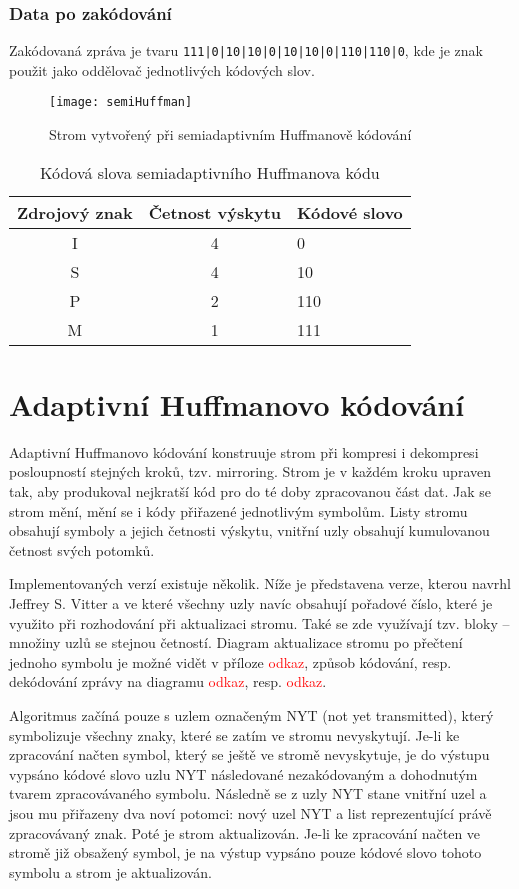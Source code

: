 \subsubsection{Data po zakódování}
Zakódovaná zpráva je tvaru \texttt{111|0|10|10|0|10|10|0|110|110|0}, kde je znak \uv{\texttt{|}} použit jako oddělovač jednotlivých kódových slov.

\begin{figure}[!htb]
\centering
\texttt{[image: semiHuffman]}
\caption{Strom vytvořený při semiadaptivním Huffmanově kódování}
\label{semiHuffmanStrom}
\end{figure}

\begin{table}[!htb]
\centering
\begin{tabular}{|c|c|l|}
\hline
Zdrojový znak & Četnost výskytu & Kódové slovo\\
\hline
I & 4 & 0\\
S & 4 & 10\\
P & 2 & 110\\
M & 1 & 111\\
\hline
\end{tabular}
\caption{Kódová slova semiadaptivního Huffmanova kódu}
\label{semiHuffmanTabulka}
\end{table}

\section{Adaptivní Huffmanovo kódování}
Adaptivní Huffmanovo kódování konstruuje strom při kompresi i dekompresi posloupností stejných kroků, tzv. mirroring. Strom je v každém kroku upraven tak, aby produkoval nejkratší kód pro do té doby zpracovanou část dat. Jak se strom mění, mění se i kódy přiřazené jednotlivým symbolům. Listy stromu obsahují symboly a jejich četnosti výskytu, vnitřní uzly obsahují kumulovanou četnost svých potomků.

Implementovaných verzí existuje několik. Níže je představena verze, kterou navrhl Jeffrey S. Vitter a ve které všechny uzly navíc obsahují pořadové číslo, které je využito při rozhodování při aktualizaci stromu. Také se zde využívají tzv. bloky -- množiny uzlů se stejnou četností. Diagram aktualizace stromu po přečtení jednoho symbolu je možné vidět v příloze \textcolor{red}{odkaz}, způsob kódování, resp. dekódování zprávy na diagramu \textcolor{red}{odkaz}, resp. \textcolor{red}{odkaz}.

Algoritmus začíná pouze s uzlem označeným NYT (not yet transmitted), který symbolizuje všechny znaky, které se zatím ve stromu nevyskytují. Je-li ke zpracování načten symbol, který se ještě ve stromě nevyskytuje, je do výstupu vypsáno kódové slovo uzlu NYT následované nezakódovaným a dohodnutým tvarem zpracovávaného symbolu. Následně se z uzly NYT stane vnitřní uzel a jsou mu přiřazeny dva noví potomci: nový uzel NYT a list reprezentující právě zpracovávaný znak. Poté je strom aktualizován. Je-li ke zpracování načten ve stromě již obsažený symbol, je na výstup vypsáno pouze kódové slovo tohoto symbolu a strom je aktualizován.

